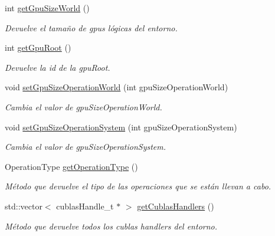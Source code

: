 \begin{DoxyCompactItemize}
int \hyperlink{classNcclMultiplicationEnvironment_a2a7968831b4ef2c0fac08ab101d3f023}{get\+Gpu\+Size\+World} ()
\begin{DoxyCompactList}\small\item\em Devuelve el tamaño de gpus lógicas del entorno. \end{DoxyCompactList}\item 
int \hyperlink{classNcclMultiplicationEnvironment_ab5303dd2bad43af17af76de714c6a9cb}{get\+Gpu\+Root} ()
\begin{DoxyCompactList}\small\item\em Devuelve la id de la gpu\+Root. \end{DoxyCompactList}\item 
void \hyperlink{classNcclMultiplicationEnvironment_adf315b8c17e4c8b81e9e81c9ab95189f}{set\+Gpu\+Size\+Operation\+World} (int gpu\+Size\+Operation\+World)
\begin{DoxyCompactList}\small\item\em Cambia el valor de gpu\+Size\+Operation\+World. \end{DoxyCompactList}\item 
void \hyperlink{classNcclMultiplicationEnvironment_ab900741a00c725fc0ff8f276a5dbc6f7}{set\+Gpu\+Size\+Operation\+System} (int gpu\+Size\+Operation\+System)
\begin{DoxyCompactList}\small\item\em Cambia el valor de gpu\+Size\+Operation\+System. \end{DoxyCompactList}\item 
Operation\+Type \hyperlink{classNcclMultiplicationEnvironment_a1300d297a3d36bfcfed004f31cfc7ac4}{get\+Operation\+Type} ()
\begin{DoxyCompactList}\small\item\em Método que devuelve el tipo de las operaciones que se están llevan a cabo. \end{DoxyCompactList}\item 
std\+::vector$<$ cublas\+Handle\+\_\+t $\ast$ $>$ \hyperlink{classNcclMultiplicationEnvironment_a225b8031310d177c5a9c25e53e1019ad}{get\+Cublas\+Handlers} ()
\begin{DoxyCompactList}\small\item\em Método que devuelve todos los cublas handlers del entorno. \end{DoxyCompactList}\item 
\mbox{\label{classNcclMultiplicationEnvironment_a06940393e09861d1043800a8beead346}} 

\end{DoxyCompactItemize}
